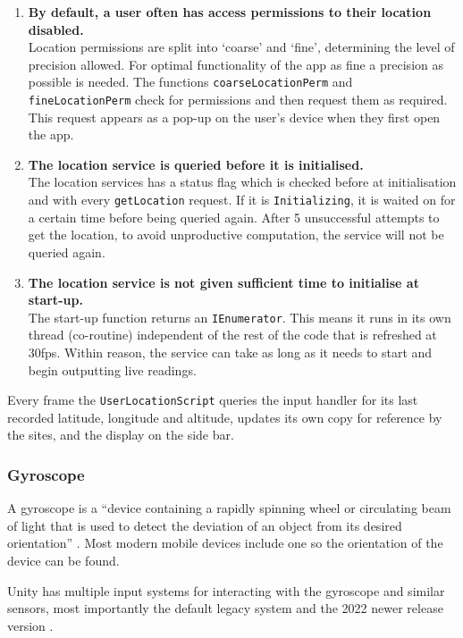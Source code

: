 \documentclass[12pt, a4paper]{article}
\begin{document}
\begin{enumerate}
    \item \textbf{By default, a user often has access permissions to their location disabled.} \\ Location permissions are split into `coarse' and `fine', determining the level of precision allowed. For optimal functionality of the app as fine a precision as possible is needed. The functions \verb|coarseLocationPerm| and \verb|fineLocationPerm| check for permissions and then request them as required. This request appears as a pop-up on the user's device when they first open the app.
    \item \textbf{The location service is queried before it is initialised.} \\ The location services has a status flag which is checked before at initialisation and with every \verb|getLocation| request. If it is \verb|Initializing|, it is waited on for a certain time before being queried again. After 5 unsuccessful attempts to get the location, to avoid unproductive computation, the service will not be queried again.
    \item \textbf{The location service is not given sufficient time to initialise at start-up.} \\ The start-up function returns an \verb|IEnumerator|. This means it runs in its own thread (co-routine) independent of the rest of the code that is refreshed at 30fps. Within reason, the service can take as long as it needs to start and begin outputting live readings.
\end{enumerate}

Every frame the \verb|UserLocationScript| queries the input handler for its last recorded latitude, longitude and altitude, updates its own copy for reference by the sites, and the display on the side bar.

\subsubsection{Gyroscope}
A gyroscope is a ``device containing a rapidly spinning wheel or circulating beam of light that is used to detect the deviation of an object from its desired orientation'' \cite{movement:whatisgyro}. Most modern mobile devices include one so the orientation of the device can be found.

Unity has multiple input systems for interacting with the gyroscope and similar sensors, most importantly the default legacy system and the 2022 newer release version \cite{movement:newinputsystem}. 
\end{document}
